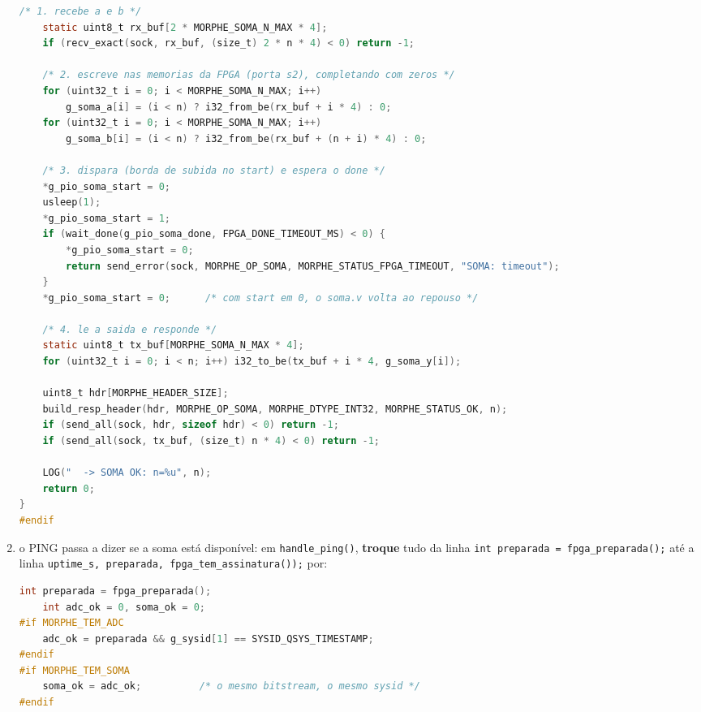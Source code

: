 \documentclass[11pt,a4paper,oneside]{article}
\begin{document}
\begin{faca}
\begin{enumerate}
\begin{lstlisting}[language=C,basicstyle=\ttfamily\scriptsize]
    /* 1. recebe a e b */
    static uint8_t rx_buf[2 * MORPHE_SOMA_N_MAX * 4];
    if (recv_exact(sock, rx_buf, (size_t) 2 * n * 4) < 0) return -1;

    /* 2. escreve nas memorias da FPGA (porta s2), completando com zeros */
    for (uint32_t i = 0; i < MORPHE_SOMA_N_MAX; i++)
        g_soma_a[i] = (i < n) ? i32_from_be(rx_buf + i * 4) : 0;
    for (uint32_t i = 0; i < MORPHE_SOMA_N_MAX; i++)
        g_soma_b[i] = (i < n) ? i32_from_be(rx_buf + (n + i) * 4) : 0;

    /* 3. dispara (borda de subida no start) e espera o done */
    *g_pio_soma_start = 0;
    usleep(1);
    *g_pio_soma_start = 1;
    if (wait_done(g_pio_soma_done, FPGA_DONE_TIMEOUT_MS) < 0) {
        *g_pio_soma_start = 0;
        return send_error(sock, MORPHE_OP_SOMA, MORPHE_STATUS_FPGA_TIMEOUT, "SOMA: timeout");
    }
    *g_pio_soma_start = 0;      /* com start em 0, o soma.v volta ao repouso */

    /* 4. le a saida e responde */
    static uint8_t tx_buf[MORPHE_SOMA_N_MAX * 4];
    for (uint32_t i = 0; i < n; i++) i32_to_be(tx_buf + i * 4, g_soma_y[i]);

    uint8_t hdr[MORPHE_HEADER_SIZE];
    build_resp_header(hdr, MORPHE_OP_SOMA, MORPHE_DTYPE_INT32, MORPHE_STATUS_OK, n);
    if (send_all(sock, hdr, sizeof hdr) < 0) return -1;
    if (send_all(sock, tx_buf, (size_t) n * 4) < 0) return -1;

    LOG("  -> SOMA OK: n=%u", n);
    return 0;
}
#endif
\end{lstlisting}
  \item o PING passa a dizer se a soma está disponível: em \texttt{handle\_ping()}, \textbf{troque} tudo da linha \texttt{int preparada = fpga\_preparada();} até a linha \texttt{uptime\_s, preparada, fpga\_tem\_assinatura());} por:
\begin{lstlisting}[language=C,basicstyle=\ttfamily\scriptsize]
    int preparada = fpga_preparada();
    int adc_ok = 0, soma_ok = 0;
#if MORPHE_TEM_ADC
    adc_ok = preparada && g_sysid[1] == SYSID_QSYS_TIMESTAMP;
#endif
#if MORPHE_TEM_SOMA
    soma_ok = adc_ok;          /* o mesmo bitstream, o mesmo sysid */
#endif


\end{lstlisting}
\end{enumerate}
\end{faca}
\end{document}

